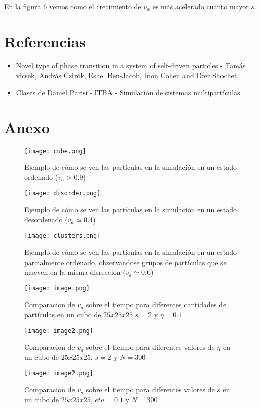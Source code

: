 \documentclass{article}
\begin{document}
\par En la figura \ref{chart3} vemos como el crecimiento de $v_a$ es m\'as acelerado cuanto mayor $s$.

\section{Referencias}

\begin{itemize}
\item Novel type of phase transition in a system of self-driven particles - Tam\'as vicsek, Andr\'as Czir\'ok, Eshel Ben-Jacob, Inon Cohen and Ofer Shochet.
\item Clases de Daniel Parisi - ITBA - Simulaci\'on de sistemas multipart\'iculas.
\end{itemize}

\section{Anexo}

\begin{figure}[h!]
\centering
\texttt{[image: cube.png]}
\caption{Ejemplo de c\'omo se ven las part\'iculas en la simulaci\'on en un estado ordenado ($v_a > 0.9$)}
\label{cube}
\end{figure}

\begin{figure}[h!]
\centering
\texttt{[image: disorder.png]}
\caption{Ejemplo de c\'omo se ven las part\'iculas en la simulaci\'on en un estado desordenado  ($v_a \simeq 0.4$)}
\label{cube}
\end{figure}

\begin{figure}[h!]
\centering
\texttt{[image: clusters.png]}
\caption{Ejemplo de c\'omo se ven las part\'iculas en la simulaci\'on en un estado parcialmente ordenado, observandose grupos de part\'iculas que se mueven en la misma disreccion  ($v_a \simeq 0.6$)}
\label{cube}
\end{figure}

\begin{figure}[h!]
\centering
\texttt{[image: image.png]}
\caption{Comparacion de $v_a$ sobre el tiempo para diferentes cantidades de part\'iculas en un cubo de $25x25x25$ $s = 2$ y $\eta = 0.1$}
\label{chart}
\end{figure}

\begin{figure}[h!]
\centering
\texttt{[image: image2.png]}
\caption{Comparacion de $v_a$ sobre el tiempo para diferentes valores de $\eta$ en un cubo de $25x25x25$, $s=2$ y $N = 300$}
\label{chart2}
\end{figure}

\begin{figure}[h!]
\centering
\texttt{[image: image2.png]}
\caption{Comparacion de $v_a$ sobre el tiempo para diferentes valores de $s$ en un cubo de $25x25x25$, $eta=0.1$ y $N = 300$}
\label{chart3}
\end{figure}
\end{document}
